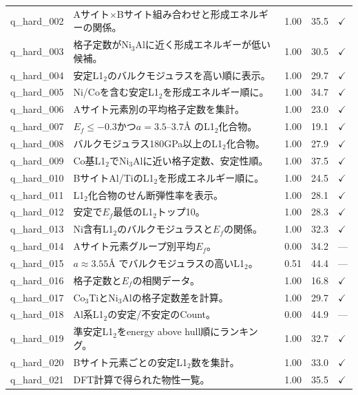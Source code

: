 \begin{longtable}{lp{8.1cm}ccl}
    q\_hard\_002 & Aサイト$\times$Bサイト組み合わせと形成エネルギーの関係。 & 1.00 & 35.5 & $\checkmark$ \\
    q\_hard\_003 & 格子定数がNi$_3$Alに近く形成エネルギーが低い候補。 & 1.00 & 30.5 & $\checkmark$ \\
    q\_hard\_004 & 安定L1$_2$のバルクモジュラスを高い順に表示。 & 1.00 & 29.7 & $\checkmark$ \\
    q\_hard\_005 & Ni/Coを含む安定L1$_2$を形成エネルギー順に。 & 1.00 & 34.7 & $\checkmark$ \\
    q\_hard\_006 & Aサイト元素別の平均格子定数を集計。 & 1.00 & 23.0 & $\checkmark$ \\
    q\_hard\_007 & $E_f \leq -0.3$かつ$a = 3.5$--$3.7$\AA{}{} のL1$_2$化合物。 & 1.00 & 19.1 & $\checkmark$ \\
    q\_hard\_008 & バルクモジュラス180GPa以上のL1$_2$化合物。 & 1.00 & 27.9 & $\checkmark$ \\
    q\_hard\_009 & Co基L1$_2$でNi$_3$Alに近い格子定数、安定性順。 & 1.00 & 37.5 & $\checkmark$ \\
    q\_hard\_010 & BサイトAl/TiのL1$_2$を形成エネルギー順に。 & 1.00 & 24.5 & $\checkmark$ \\
    q\_hard\_011 & L1$_2$化合物のせん断弾性率を表示。 & 1.00 & 28.1 & $\checkmark$ \\
    q\_hard\_012 & 安定で$E_f$最低のL1$_2$トップ10。 & 1.00 & 28.3 & $\checkmark$ \\
    q\_hard\_013 & Ni含有L1$_2$のバルクモジュラスと$E_f$の関係。 & 1.00 & 32.3 & $\checkmark$ \\
    q\_hard\_014 & Aサイト元素グループ別平均$E_f$。 & 0.00 & 34.2 & --- \\
    q\_hard\_015 & $a \approx 3.55$\AA{}{} でバルクモジュラスの高いL1$_2$。 & 0.51 & 44.4 & --- \\
    q\_hard\_016 & 格子定数と$E_f$の相関データ。 & 1.00 & 16.8 & $\checkmark$ \\
    q\_hard\_017 & Co$_3$TiとNi$_3$Alの格子定数差を計算。 & 1.00 & 29.7 & $\checkmark$ \\
    q\_hard\_018 & Al系L1$_2$の安定/不安定のCount。 & 0.00 & 44.9 & --- \\
    q\_hard\_019 & 準安定L1$_2$をenergy above hull順にランキング。 & 1.00 & 32.7 & $\checkmark$ \\
    q\_hard\_020 & Bサイト元素ごとの安定L1$_2$数を集計。 & 1.00 & 33.0 & $\checkmark$ \\
    q\_hard\_021 & DFT計算で得られた物性一覧。 & 1.00 & 35.5 & $\checkmark$ \\

\end{longtable}
